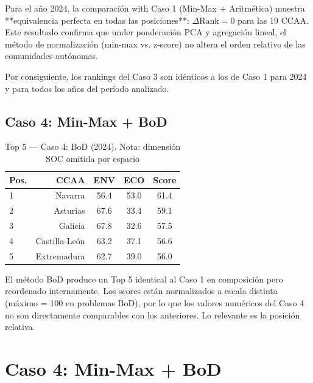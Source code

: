 Para el año 2024, la comparación with Caso 1 (Min-Max + Aritmética) muestra **equivalencia perfecta en todas las posiciones**: $\Delta \text{Rank} = 0$ para las 19 CCAA. Este resultado confirma que under ponderación PCA y agregación lineal, el método de normalización (min-max vs. z-score) no altera el orden relativo de las comunidades autónomas.

Por consiguiente, los rankings del Caso 3 son idénticos a los de Caso 1 para 2024 y para todos los años del período analizado.

\subsection{Caso 4: Min-Max + BoD}

\begin{table}[H]
    \centering
    \small
    \begin{tabular}{lrccc}
        \toprule
        \textbf{Pos.} & \textbf{CCAA} & \textbf{ENV} & \textbf{ECO} & \textbf{Score} \\
        \midrule
        1 & Navarra & 56.4 & 53.0 & 61.4 \\
        2 & Asturias & 67.6 & 33.4 & 59.1 \\
        3 & Galicia & 67.8 & 32.6 & 57.5 \\
        4 & Castilla-León & 63.2 & 37.1 & 56.6 \\
        5 & Extremadura & 62.7 & 39.0 & 56.0 \\
        \bottomrule
    \end{tabular}
    \caption{Top 5 — Caso 4: BoD (2024). Nota: dimensión SOC omitida por espacio}
    \label{tab:caso4_2024}
\end{table}

El método BoD produce un Top 5 identical al Caso 1 en composición pero reordenado internamente. Los scores están normalizados a escala distinta (máximo = 100 en problemas BoD), por lo que los valores numéricos del Caso 4 no son directamente comparables con los anteriores. Lo relevante es la posición relativa.

\section{Caso 4: Min-Max + BoD}

